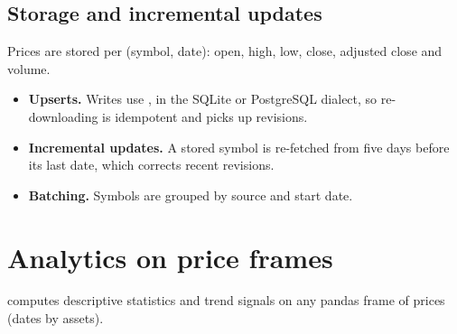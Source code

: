 \section{Storage and incremental updates}
Prices are stored per (symbol, date): open, high, low, close, adjusted close and volume.
\begin{itemize}
  \item \textbf{Upserts.} Writes use , in the SQLite
        or PostgreSQL dialect, so re-downloading is idempotent and picks up revisions.
  \item \textbf{Incremental updates.} A stored symbol is re-fetched from five days before
        its last date, which corrects recent revisions.
  \item \textbf{Batching.} Symbols are grouped by source and start date.
\end{itemize}
\begin{codepointers}
\end{codepointers}

\chapter{Analytics on price frames}\label{p:sec:stats}
 computes descriptive statistics and trend signals on any
pandas frame of prices (dates by assets).

